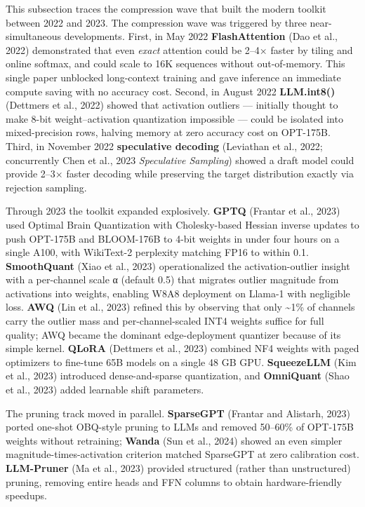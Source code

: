 This subsection traces the compression wave that built the modern toolkit between 2022 and 2023. The compression wave was triggered by three near-simultaneous developments. First, in May 2022 \textbf{FlashAttention} (Dao et al., 2022) demonstrated that even \emph{exact} attention could be 2--4× faster by tiling and online softmax, and could scale to 16K sequences without out-of-memory. This single paper unblocked long-context training and gave inference an immediate compute saving with no accuracy cost. Second, in August 2022 \textbf{LLM.int8()} (Dettmers et al., 2022) showed that activation outliers --- initially thought to make 8-bit weight--activation quantization impossible --- could be isolated into mixed-precision rows, halving memory at zero accuracy cost on OPT-175B. Third, in November 2022 \textbf{speculative decoding} (Leviathan et al., 2022; concurrently Chen et al., 2023 \emph{Speculative Sampling}) showed a draft model could provide 2--3× faster decoding while preserving the target distribution exactly via rejection sampling.

Through 2023 the toolkit expanded explosively. \textbf{GPTQ} (Frantar et al., 2023) used Optimal Brain Quantization with Cholesky-based Hessian inverse updates to push OPT-175B and BLOOM-176B to 4-bit weights in under four hours on a single A100, with WikiText-2 perplexity matching FP16 to within 0.1. \textbf{SmoothQuant} (Xiao et al., 2023) operationalized the activation-outlier insight with a per-channel scale α (default 0.5) that migrates outlier magnitude from activations into weights, enabling W8A8 deployment on Llama-1 with negligible loss. \textbf{AWQ} (Lin et al., 2023) refined this by observing that only \textasciitilde1\% of channels carry the outlier mass and per-channel-scaled INT4 weights suffice for full quality; AWQ became the dominant edge-deployment quantizer because of its simple kernel. \textbf{QLoRA} (Dettmers et al., 2023) combined NF4 weights with paged optimizers to fine-tune 65B models on a single 48 GB GPU. \textbf{SqueezeLLM} (Kim et al., 2023) introduced dense-and-sparse quantization, and \textbf{OmniQuant} (Shao et al., 2023) added learnable shift parameters.

The pruning track moved in parallel. \textbf{SparseGPT} (Frantar and Alistarh, 2023) ported one-shot OBQ-style pruning to LLMs and removed 50--60\% of OPT-175B weights without retraining; \textbf{Wanda} (Sun et al., 2024) showed an even simpler magnitude-times-activation criterion matched SparseGPT at zero calibration cost. \textbf{LLM-Pruner} (Ma et al., 2023) provided structured (rather than unstructured) pruning, removing entire heads and FFN columns to obtain hardware-friendly speedups.

